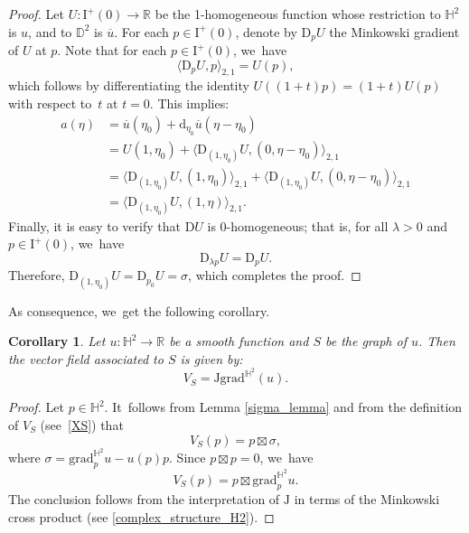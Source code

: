 \documentclass[JEP,XML,SOM,Unicode,NoEqCountersInSection, NoFloatCountersInSection,published]{cedram}
\theoremstyle{plain}
\newtheorem{cor}{Corollary}[section]
\theoremstyle{definition}
\newcommand{\I}{\mathrm{I}}
\newcommand{\grad}{\mathrm{grad}^{\mathbb{H}^2}}
\newcommand{\J}{\mathrm{J}}
\begin{document}
\begin{proof}
Let \(U: \I^+(0) \to \mathbb{R} \) be the 1-homogeneous function whose restriction to \(\mathbb{H}^2 \) is \(u \), and to \(\mathbb{D}^2 \) is \(\overline{u} \).
For each \(p \in \I^{+}(0) \), denote by \(\mathrm{D}_p U \) the Minkowski gradient of \(U \) at \(p \). Note that for each \(p \in \I^{+}(0) \), we~have
\[
\langle \mathrm{D}_p U, p \rangle_{2,1} = U(p),
\]
which follows by differentiating the identity \(U((1+t)p) = (1+t)U(p) \) with respect to~\(t \) at \(t=0 \).
This implies:
\begin{align*}
a(\eta) &= \overline{u}(\eta_0) + \mathrm{d}_{\eta_0} \overline{u}(\eta - \eta_0) \\
&= U(1, \eta_0) + \langle \mathrm{D}_{(1, \eta_0)} U, (0, \eta - \eta_0) \rangle_{2,1} \\
&= \langle \mathrm{D}_{(1, \eta_0)} U, (1, \eta_0) \rangle_{2,1} + \langle \mathrm{D}_{(1, \eta_0)} U, (0, \eta - \eta_0) \rangle_{2,1} \\
&= \langle \mathrm{D}_{(1, \eta_0)} U, (1, \eta) \rangle_{2,1}.
\end{align*}
Finally, it is easy to verify that \(\mathrm{D}U \) is 0-homogeneous; that is, for all \(\lambda > 0 \) and \(p \in \I^{+}(0) \), we~have
\[
\mathrm{D}_{\lambda p} U = \mathrm{D}_p U.
\]
Therefore, \(\mathrm{D}_{(1, \eta_0)} U = \mathrm{D}_{p_0} U = \sigma \), which completes the proof.
\end{proof}
As consequence, we~get the following corollary.
\begin{cor}\label{cor_formule_XS}
Let $u:\mathbb{H}^2\to\mathbb{R}$ be a smooth function and $S$ be the graph of $u$. Then the vector field associated to $S$ is given by:
\[
V_S=\J\grad(u).
\]
\end{cor}
\begin{proof}
Let $p\in\mathbb{H}^2$. It~follows from Lemma \ref{sigma_lemma} and from the definition of $V_S$ (see~\eqref{XS}) that
\[
V_S(p)=p\boxtimes\sigma,
\]
where
$\sigma=\grad_{p}u-u(p)p$. Since $p\boxtimes p=0$, we~have
\[
V_S(p)=p\boxtimes\grad_{p}u.
\]The conclusion follows from the interpretation of $\J$ in terms of the Minkowski cross product (see \eqref{complex_structure_H2}).
\end{proof}
\end{document}
